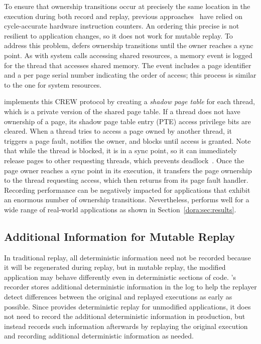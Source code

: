 To ensure that ownership transitions occur at precisely the same
location in the execution during both record and replay, previous
approaches~\cite{bressoud-tft,bressoud,revirt,smp-revirt:vee08}
have relied on cycle-accurate hardware instruction counters.  An ordering
this precise is not resilient to application changes, so it does not work for
mutable replay. To address this problem, {\dora} defers ownership
transitions until the owner reaches a sync point.  As with system
calls accessing shared resources, a memory event is logged for the
thread that accesses shared memory. The event includes a page
identifier and a per page serial number indicating the order of access; this
process is similar to the one for system resources.

{\dora} implements this CREW protocol by creating a
\emph{shadow page table} for each thread, which is a private version
of the shared page table.   If a thread does not have ownership of a
page, its shadow page table entry (PTE) access privilege bits are
cleared.  When a thread tries to access a page owned by another
thread, it triggers a page fault, notifies the owner, and blocks
until access is granted.  Note that while the thread is blocked, it
is in a sync point, so it can immediately release pages to other
requesting threads, which prevents
deadlock~\cite{scribe:sigmetrics10}.  Once the page owner reaches a
sync point in its execution, it transfers the page ownership to the
thread requesting access, which then returns from its page fault
handler.
Recording performance can be negatively impacted for applications that
exhibit an enormous number of ownership transitions.  Nevertheless,
{\dora} performs well for a wide range of 
real-world applications as shown in Section~\ref{dora:sec:results}.

\subsection{Additional Information for Mutable Replay}

In traditional replay, all deterministic information need not be
recorded because it will be regenerated during replay, but in mutable
replay, the modified application may behave differently even in
deterministic sections of code.  {\dora}'s recorder stores
additional deterministic information in the log to help the replayer
detect differences between the original and replayed
executions as early as possible.  Since {\dora} provides deterministic replay for
unmodified applications, it does not need to record the additional
deterministic information in production, but instead records such
information afterwards by replaying the original
execution and recording additional deterministic information as
needed.

